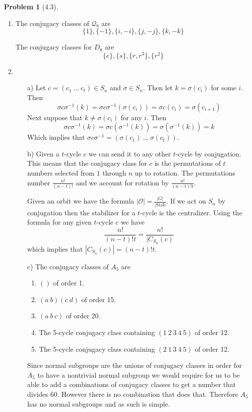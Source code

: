 \documentclass[10pt]{article}
\newcommand{\sk}{\vskip 10mm}
\theoremstyle{plain}
\newtheorem{problem}{Problem}
\theoremstyle{remark}
\begin{document}
\sk

\begin{problem}[4.3]
  
\end{problem}

\begin{enumerate}
\item The conjugacy classes of $\mathcal{Q}_8$ are
  \[ \{1\},\{-1\},\{i,-i\},\{j,-j\},\{k,-k\} \]

  The conjugacy classes for $D_8$ are
  \[ \{e\},\{s\},\{r,r^3\},\{r^2\}\]
\item
  \begin{itemize}
  \item[a)] Let $c=(c_1\ \ldots\ c_t)\in S_n$ and $\sigma\in S_n$. Then let
    $k=\sigma(c_i)$ for some $i$. Then
    \[ \sigma c\sigma^{-1}(k)=\sigma c\sigma^{-1}(\sigma(c_i))=\sigma c(c_i)=\sigma(c_{i+1})\]
    Next suppose that $k\neq\sigma(c_i)$ for any $i$. Then
    \[ \sigma c\sigma^{-1}(k)=\sigma c(\sigma^{-1}(k))=\sigma(\sigma^{-1}(k))=k\]
    Which implies that $\sigma c\sigma^{-1}=(\sigma(c_1)\ \ldots\ \sigma(c_t))$.
  \item[b)] Given a $t$-cycle $c$ we can send it to any other
    $t$-cycle by conjugation. This means that the conjugacy
    class for $c$ is the permutations of $t$ numbers selected
    from $1$ through $n$ up to rotation. The permutations
    number $\frac{n!}{(n-t)!}$ and we account for rotation
    by $\frac{n!}{(n-t)!t}$.

    Given an orbit we have the formula $|\mathcal{O}|=\frac{|G|}{|\text{Stab}}$.
    If we act on $S_n$ by conjugation then the stabilizer for a $t$-cycle is
    the centralizer. Using the formula for any given $t$-cycle $c$ we have
    \[ \frac{n!}{(n-t)!t}=\frac{n!}{|C_{S_n}(c)}\]
    which implies that $|C_{S_n}(c)|=(n-t)!t$.
  \item[c)] The conjugacy classes of $A_5$ are
    \begin{enumerate}
    \item $()$ of order 1.
    \item $(a\ b)(c\ d)$ of order 15.
    \item $(a\ b\ c)$ of order 20.
    \item The 5-cycle conjugacy class containing $(1\ 2\ 3\ 4\ 5)$ of order 12.
    \item The 5-cycle conjugacy class containing $(2\ 1\ 3\ 4\ 5)$ of order 12.
    \end{enumerate}

    Since normal subgroups are the unions of conjugacy classes in order for $A_5$ to have a nontrivial normal
    subgroup we would require for us to be able to add a combinations of conjugacy classes to get
    a number that divides 60. However there is no combination that does that.
    Therefore $A_5$ has no normal subgroups and as such is simple.
  \end{itemize}
\end{enumerate}
\end{document}
